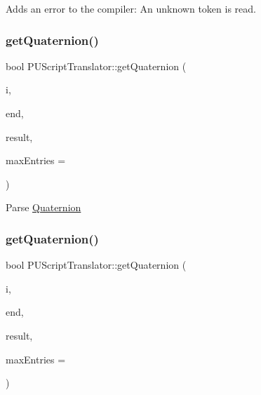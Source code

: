 Adds an error to the compiler\+: An unknown token is read. \mbox{\label{classPUScriptTranslator_a0181ae407bbaabee7ea22cad4053c601}} 
\subsubsection{\texorpdfstring{get\+Quaternion()}{getQuaternion()}\hspace{0.1cm}{\footnotesize\ttfamily [1/2]}}
{\footnotesize\ttfamily bool P\+U\+Script\+Translator\+::get\+Quaternion (\begin{DoxyParamCaption}\item[{P\+U\+Abstract\+Node\+List\+::const\+\_\+iterator}]{i,  }\item[{P\+U\+Abstract\+Node\+List\+::const\+\_\+iterator}]{end,  }\item[{\hyperlink{classQuaternion}{Quaternion} $\ast$}]{result,  }\item[{int}]{max\+Entries = {} }\end{DoxyParamCaption})}

Parse \hyperlink{classQuaternion}{Quaternion} \mbox{\label{classPUScriptTranslator_a0181ae407bbaabee7ea22cad4053c601}} 
\subsubsection{\texorpdfstring{get\+Quaternion()}{getQuaternion()}\hspace{0.1cm}{\footnotesize\ttfamily [2/2]}}
{\footnotesize\ttfamily bool P\+U\+Script\+Translator\+::get\+Quaternion (\begin{DoxyParamCaption}\item[{P\+U\+Abstract\+Node\+List\+::const\+\_\+iterator}]{i,  }\item[{P\+U\+Abstract\+Node\+List\+::const\+\_\+iterator}]{end,  }\item[{\hyperlink{classQuaternion}{Quaternion} $\ast$}]{result,  }\item[{int}]{max\+Entries = {} }\end{DoxyParamCaption})}

